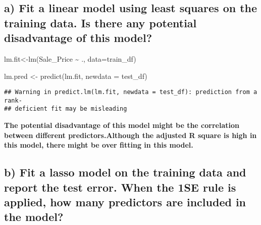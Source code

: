\documentclass[
]{article}
\newenvironment{Shaded}{\begin{snugshade}}{\end{snugshade}}
\newcommand{\AttributeTok}[1]{\textcolor[rgb]{0.77,0.63,0.00}{#1}}
\newcommand{\CommentTok}[1]{\textcolor[rgb]{0.56,0.35,0.01}{\textit{#1}}}
\newcommand{\DecValTok}[1]{\textcolor[rgb]{0.00,0.00,0.81}{#1}}
\newcommand{\FunctionTok}[1]{\textcolor[rgb]{0.00,0.00,0.00}{#1}}
\newcommand{\NormalTok}[1]{#1}
\newcommand{\OtherTok}[1]{\textcolor[rgb]{0.56,0.35,0.01}{#1}}
\newcommand{\SpecialCharTok}[1]{\textcolor[rgb]{0.00,0.00,0.00}{#1}}
\begin{document}
\hypertarget{a-fit-a-linear-model-using-least-squares-on-the-training-data.-is-there-any-potential-disadvantage-of-this-model}{%
\subsection{a) Fit a linear model using least squares on the training
data. Is there any potential disadvantage of this
model?}\label{a-fit-a-linear-model-using-least-squares-on-the-training-data.-is-there-any-potential-disadvantage-of-this-model}}

\begin{Shaded}
\begin{Highlighting}[]
\NormalTok{lm.fit}\OtherTok{\textless{}{-}}\FunctionTok{lm}\NormalTok{(Sale\_Price }\SpecialCharTok{\textasciitilde{}}\NormalTok{ ., }\AttributeTok{data=}\NormalTok{train\_df)}

\NormalTok{lm.pred }\OtherTok{\textless{}{-}} \FunctionTok{predict}\NormalTok{(lm.fit, }\AttributeTok{newdata =}\NormalTok{ test\_df)}
\end{Highlighting}
\end{Shaded}

\begin{verbatim}
## Warning in predict.lm(lm.fit, newdata = test_df): prediction from a rank-
## deficient fit may be misleading
\end{verbatim}

\begin{Shaded}
\end{Shaded}

\textbf{The potential disadvantage of this model might be the
correlation between different predictors.Although the adjusted R square
is high in this model, there might be over fitting in this model.}

\hypertarget{b-fit-a-lasso-model-on-the-training-data-and-report-the-test-error.-when-the-1se-rule-is-applied-how-many-predictors-are-included-in-the-model}{%
\subsection{b) Fit a lasso model on the training data and report the
test error. When the 1SE rule is applied, how many predictors are
included in the
model?}\label{b-fit-a-lasso-model-on-the-training-data-and-report-the-test-error.-when-the-1se-rule-is-applied-how-many-predictors-are-included-in-the-model}}
\end{document}
